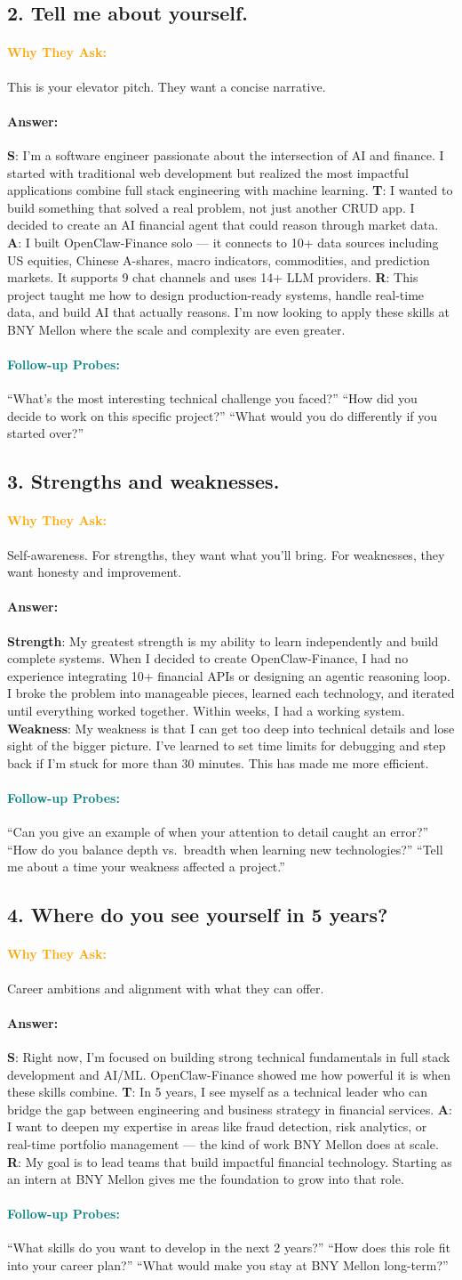 \documentclass[11pt,a4paper]{article}
\newcommand{\Q}[1]{\subsection{#1}}
\newcommand{\Ans}[1]{\paragraph{\textbf{Answer:}} #1}
\newcommand{\Why}{\paragraph{\textcolor{orange}{\textbf{Why They Ask:}}}}
\newcommand{\Probe}{\paragraph{\textcolor{teal}{\textbf{Follow-up Probes:}}}}
\begin{document}
\Q{2. Tell me about yourself.}
\Why This is your elevator pitch. They want a concise narrative.
\Ans \textbf{S}: I'm a software engineer passionate about the intersection of AI and finance. I started with traditional web development but realized the most impactful applications combine full stack engineering with machine learning. \textbf{T}: I wanted to build something that solved a real problem, not just another CRUD app. I decided to create an AI financial agent that could reason through market data. \textbf{A}: I built OpenClaw-Finance solo --- it connects to 10+ data sources including US equities, Chinese A-shares, macro indicators, commodities, and prediction markets. It supports 9 chat channels and uses 14+ LLM providers. \textbf{R}: This project taught me how to design production-ready systems, handle real-time data, and build AI that actually reasons. I'm now looking to apply these skills at BNY Mellon where the scale and complexity are even greater.
\Probe ``What's the most interesting technical challenge you faced?'' ``How did you decide to work on this specific project?'' ``What would you do differently if you started over?''

\Q{3. Strengths and weaknesses.}
\Why Self-awareness. For strengths, they want what you'll bring. For weaknesses, they want honesty and improvement.
\Ans \textbf{Strength}: My greatest strength is my ability to learn independently and build complete systems. When I decided to create OpenClaw-Finance, I had no experience integrating 10+ financial APIs or designing an agentic reasoning loop. I broke the problem into manageable pieces, learned each technology, and iterated until everything worked together. Within weeks, I had a working system. \textbf{Weakness}: My weakness is that I can get too deep into technical details and lose sight of the bigger picture. I've learned to set time limits for debugging and step back if I'm stuck for more than 30 minutes. This has made me more efficient.
\Probe ``Can you give an example of when your attention to detail caught an error?'' ``How do you balance depth vs.\ breadth when learning new technologies?'' ``Tell me about a time your weakness affected a project.''

\Q{4. Where do you see yourself in 5 years?}
\Why Career ambitions and alignment with what they can offer.
\Ans \textbf{S}: Right now, I'm focused on building strong technical fundamentals in full stack development and AI/ML. OpenClaw-Finance showed me how powerful it is when these skills combine. \textbf{T}: In 5 years, I see myself as a technical leader who can bridge the gap between engineering and business strategy in financial services. \textbf{A}: I want to deepen my expertise in areas like fraud detection, risk analytics, or real-time portfolio management --- the kind of work BNY Mellon does at scale. \textbf{R}: My goal is to lead teams that build impactful financial technology. Starting as an intern at BNY Mellon gives me the foundation to grow into that role.
\Probe ``What skills do you want to develop in the next 2 years?'' ``How does this role fit into your career plan?'' ``What would make you stay at BNY Mellon long-term?''
\end{document}
